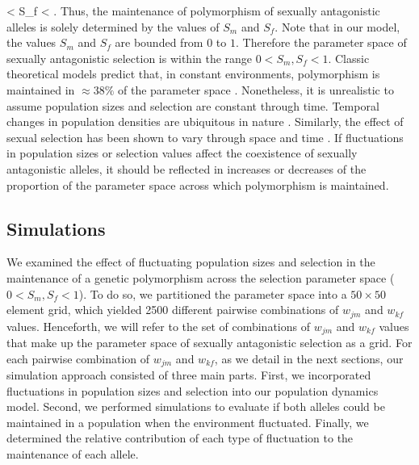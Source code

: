 \documentclass[12pt]{article}
\let\oldequation\equation
\let\oldendequation\endequation
\renewenvironment{equation}
  {\linenomathNonumbers\oldequation}
  {\oldendequation\endlinenomath}
\begin{document}
\begin{equation}
 < S_{f} < 
\label{selection}
\end{equation}
\citep{kidwell1977regions,pamilo1979genic,patten2010fitness,connallon_evolutionary_2018}. Thus, the maintenance of polymorphism of sexually antagonistic alleles is solely determined by the values of $S_{m}$ and $S_{f}$. Note that in our model, the values $S_{m}$ and $S_{f}$ are bounded from $0$ to $1$. Therefore the parameter space of sexually antagonistic selection is within the range $ 0< S_{m}, S_{f} < 1$. Classic theoretical models predict that, in constant environments, polymorphism is maintained in $\approx 38\%$ of the parameter space \citep{kidwell1977regions,pamilo1979genic,connallon_evolutionary_2018}. Nonetheless, it is unrealistic to assume population sizes and selection are constant through time. Temporal changes in population densities are ubiquitous in nature \citep{whitlock1992temporal,connallon2012general,reinhold2000maintenance}. Similarly, the effect of sexual selection has been shown to vary through space and time \citep{kasumovic2008spatial}. If fluctuations in population sizes or selection values affect the coexistence of sexually antagonistic alleles, it should be reflected in increases or decreases of the proportion of the parameter space across which polymorphism is maintained.

\subsection*{Simulations}
We examined the effect of fluctuating population sizes and selection in the maintenance of a genetic polymorphism across the selection parameter space ($0 < S_{m}, S_{f} < 1$). To do so, we partitioned the parameter space into a $50 \times 50$ element grid, which yielded 2500 different pairwise combinations of $w_{jm}$ and $w_{kf}$ values. Henceforth, we will refer to the set of combinations of $w_{jm}$ and $w_{kf}$ values that make up the parameter space of sexually antagonistic selection as a grid. For each pairwise combination of $w_{jm}$ and $w_{kf}$, as we detail in the next sections, our simulation approach consisted of three main parts. First, we incorporated fluctuations in population sizes and selection into our population dynamics model. Second, we performed simulations to evaluate if both alleles could be maintained in a population when the environment fluctuated. Finally, we determined the relative contribution of each type of fluctuation to the maintenance of each allele.
\end{document}

